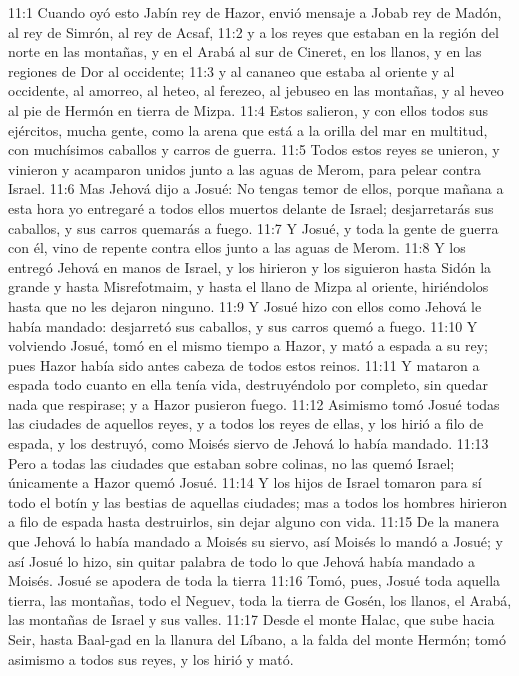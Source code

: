 11:1 Cuando oyó esto Jabín rey de Hazor, envió mensaje a Jobab rey de Madón, al rey de Simrón, al rey de Acsaf,  
11:2 y a los reyes que estaban en la región del norte en las montañas, y en el Arabá al sur de Cineret, en los llanos, y en las regiones de Dor al occidente;  
11:3 y al cananeo que estaba al oriente y al occidente, al amorreo, al heteo, al ferezeo, al jebuseo en las montañas, y al heveo al pie de Hermón en tierra de Mizpa.  
11:4 Estos salieron, y con ellos todos sus ejércitos, mucha gente, como la arena que está a la orilla del mar en multitud, con muchísimos caballos y carros de guerra.  
11:5 Todos estos reyes se unieron, y vinieron y acamparon unidos junto a las aguas de Merom, para pelear contra Israel.  
11:6 Mas Jehová dijo a Josué: No tengas temor de ellos, porque mañana a esta hora yo entregaré a todos ellos muertos delante de Israel; desjarretarás sus caballos, y sus carros quemarás a fuego.  
11:7 Y Josué, y toda la gente de guerra con él, vino de repente contra ellos junto a las aguas de Merom.  
11:8 Y los entregó Jehová en manos de Israel, y los hirieron y los siguieron hasta Sidón la grande y hasta Misrefotmaim, y hasta el llano de Mizpa al oriente, hiriéndolos hasta que no les dejaron ninguno.  
11:9 Y Josué hizo con ellos como Jehová le había mandado: desjarretó sus caballos, y sus carros quemó a fuego.  
11:10 Y volviendo Josué, tomó en el mismo tiempo a Hazor, y mató a espada a su rey; pues Hazor había sido antes cabeza de todos estos reinos.  
11:11 Y mataron a espada todo cuanto en ella tenía vida, destruyéndolo por completo, sin quedar nada que respirase; y a Hazor pusieron fuego.  
11:12 Asimismo tomó Josué todas las ciudades de aquellos reyes, y a todos los reyes de ellas, y los hirió a filo de espada, y los destruyó, como Moisés siervo de Jehová lo había mandado.  
11:13 Pero a todas las ciudades que estaban sobre colinas, no las quemó Israel; únicamente a Hazor quemó Josué.  
11:14 Y los hijos de Israel tomaron para sí todo el botín y las bestias de aquellas ciudades; mas a todos los hombres hirieron a filo de espada hasta destruirlos, sin dejar alguno con vida.  
11:15 De la manera que Jehová lo había mandado a Moisés su siervo, así Moisés lo mandó a Josué; y así Josué lo hizo, sin quitar palabra de todo lo que Jehová había mandado a Moisés.  
Josué se apodera de toda la tierra  
11:16 Tomó, pues, Josué toda aquella tierra, las montañas, todo el Neguev, toda la tierra de Gosén, los llanos, el Arabá, las montañas de Israel y sus valles.  
11:17 Desde el monte Halac, que sube hacia Seir, hasta Baal-gad en la llanura del Líbano, a la falda del monte Hermón; tomó asimismo a todos sus reyes, y los hirió y mató.  
